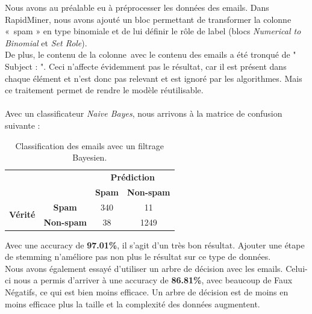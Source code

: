 \documentclass[a4paper]{article}
\begin{document}
Nous avons au préalable eu à préprocesser les données des emails. Dans RapidMiner, nous avons ajouté un bloc permettant de transformer la colonne « spam » en type binomiale et de lui définir le rôle de label (blocs \textit{Numerical to Binomial} et \textit{Set Role}).
\\
De plus, le contenu de la colonne avec le contenu des emails a été tronqué de " Subject : ". Ceci n'affecte évidemment pas le résultat, car il est présent dans chaque élément et n'est donc pas relevant et est ignoré par les algorithmes. Mais ce traitement permet de rendre le modèle réutilisable.
\\\\
Avec un classificateur \textit{Naive Bayes}, nous arrivons à la matrice de confusion suivante :


\begin{table}[H]
	\centering
	\begin{tabular}{cccl}
	\def\arraystretch{2.0}
	& \textbf{}
	& \multicolumn{2}{c}{\textbf{Prédiction}}\\ \cline{3-4}
	& \multicolumn{1}{c|}{}
	& \multicolumn{1}{c|}{\textbf{Spam}}
	& \multicolumn{1}{c|}{\textbf{Non-spam}} \\ \cline{2-4}
	\multicolumn{1}{c|}{\multirow{2}{*}{\textbf{Vérité}}}
	& \multicolumn{1}{c|}{\textbf{Spam}}
	& \multicolumn{1}{c|}{340}
	& \multicolumn{1}{c|}{11}\\ \cline{2-4} 
	\multicolumn{1}{c|}{}
	& \multicolumn{1}{c|}{\textbf{Non-spam}}
	& \multicolumn{1}{c|}{38}
	& \multicolumn{1}{c|}{1249}\\ \cline{2-4} 
	
	\end{tabular}
	\caption{Classification des emails avec un filtrage Bayesien.}
\end{table}

Avec une accuracy de \textbf{97.01\%}, il s'agit d'un très bon résultat.
Ajouter une étape de stemming n'améliore pas non plus le résultat sur ce type de données.
\\

Nous avons également essayé d'utiliser un arbre de décision avec les emails.
Celui-ci nous a permis d'arriver à une accuracy de \textbf{86.81\%}, avec beaucoup de Faux Négatifs, ce qui est bien moins efficace.
Un arbre de décision est de moins en moins efficace plus la taille et la complexité des données augmentent.
\end{document}
